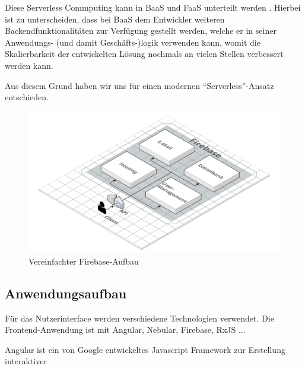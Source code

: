 Diese Serverless Commputing kann in \ac{BaaS} und \ac{FaaS} unterteilt werden \autocite{whatIsServerless}. Hierbei ist zu unterscheiden, dass bei \ac{BaaS} dem Entwickler weiteren Backendfunktionalitäten zur Verfügung gestellt werden, welche er in seiner Anwendungs- (und damit Geschäfts-)logik verwenden kann, womit die Skalierbarkeit der entwickelten Lösung nochmals an vielen Stellen verbessert werden kann.


Aus diesem Grund haben wir uns für einen modernen \enquote{Serverless}-Ansatz entschieden.





\begin{figure}[h]
    \centering
    \includegraphics[width=.9\textwidth]{img/Firebase.png}
    \caption{Vereinfachter Firebase-Aufbau}
    \label{fig:firebaseAufbau}
\end{figure}



\subsection{Anwendungsaufbau}
Für das Nutzerinterface werden verschiedene Technologien verwendet.
Die Frontend-Anwendung ist mit Angular, Nebular, Firebase, RxJS ... %


Angular ist ein von Google entwickeltes Javascript Framework zur Erstellung interaktiver 



